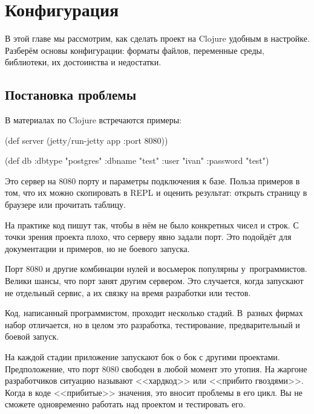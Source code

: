 \chapter{Конфигурация}


\label{chapter-config}

\begin{teaser}
В этой главе мы рассмотрим, как сделать проект на Clojure удобным в
настройке. Разберём основы конфигурации: форматы файлов, переменные среды,
библиотеки, их достоинства и недостатки.
\end{teaser}

\section{Постановка проблемы}

В материалах по Clojure встречаются примеры:

\begin{english}
  \begin{clojure}
(def server
  (jetty/run-jetty app {:port 8080}))

(def db {:dbtype   "postgres"
         :dbname   "test"
         :user     "ivan"
         :password "test"})
  \end{clojure}
\end{english}

Это сервер на 8080 порту и параметры подключения к базе. Польза примеров в том,
что их можно скопировать в REPL и оценить результат: открыть страницу в браузере
или прочитать таблицу.

На практике код пишут так, чтобы в нём не было конкретных чисел и строк. С точки
зрения проекта плохо, что серверу явно задали порт. Это подойдёт для
документации и примеров, но не боевого запуска.

Порт 8080 и другие комбинации нулей и восьмерок популярны
у~программистов. Велики шансы, что порт занят другим сервером. Это случается,
когда запускают не отдельный сервис, а их связку на время разработки или тестов.

Код, написанный программистом, проходит несколько стадий. В~разных фирмах набор
отличается, но в целом это разработка, тестирование, предварительный и боевой
запуск.


\label{hardcode}

На каждой стадии приложение запускают бок о бок с другими
проектами. Предположение, что порт 8080 свободен в любой момент это утопия. На
жаргоне разработчиков ситуацию называют <<хардкод>>  или <<прибито
гвоздями>>. Когда в коде <<прибитые>> значения, это вносит проблемы в его
цикл. Вы не сможете одновременно работать над проектом и тестировать его.

